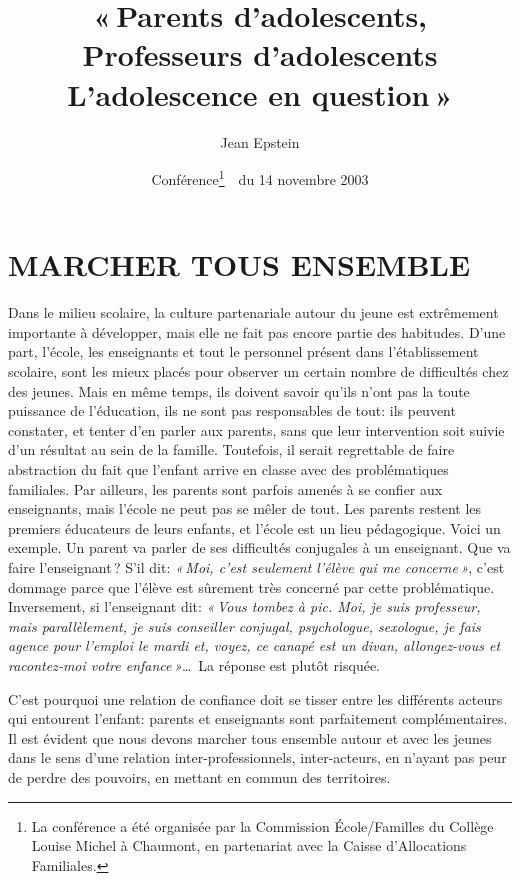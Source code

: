 \documentclass[11pt]{article} %
\title{« Parents d'adolescents, Professeurs d'adolescents\\L'adolescence en question »}
\author{Jean Epstein}
\date{Conférence\footnote{La conférence a été organisée par la Commission École/Familles du Collège Louise Michel à Chaumont, en partenariat avec la Caisse d’Allocations Familiales.}\ \ du 14 novembre 2003}
\begin{document}
\maketitle


\section{MARCHER TOUS ENSEMBLE}

  Dans le milieu scolaire, la culture partenariale autour du jeune est extrêmement importante à développer, mais elle ne fait pas encore partie des habitudes.\newline
  D'une part, l'école, les enseignants et tout le personnel présent dans l'établissement scolaire, sont les mieux placés pour observer un certain nombre de difficultés chez des jeunes. Mais en même temps, ils doivent savoir qu'ils n'ont pas la toute puissance de l'éducation, ils ne sont pas responsables de tout: ils peuvent constater, et tenter d'en parler aux parents, sans que leur intervention soit suivie d'un résultat au sein de la famille. Toutefois, il serait regrettable de faire abstraction du fait que l'enfant arrive en classe avec des problématiques familiales.\newline
  Par ailleurs, les parents sont parfois amenés à se confier aux enseignants, mais l'école ne peut pas se mêler de tout. Les parents restent les premiers éducateurs de leurs enfants, et l'école est un lieu pédagogique.\newline
  Voici un exemple. Un parent va parler de ses difficultés conjugales à un enseignant. Que va faire l'enseignant ? S'il dit: \textit{« Moi, c'est seulement l'élève qui me concerne »}, c'est dommage parce que l'élève est sûrement très concerné par cette problématique. Inversement, si l'enseignant dit: \textit{« Vous tombez à pic. Moi, je suis professeur, mais parallèlement, je suis conseiller conjugal, psychologue, sexologue, je fais agence pour l'emploi le mardi et, voyez, ce canapé est un divan, allongez-vous et racontez-moi votre enfance »}\dots\ La réponse est plutôt risquée.

  C'est pourquoi une relation de confiance doit se tisser entre les différents acteurs qui entourent l'enfant: parents et enseignants sont parfaitement complémentaires.\newline
  Il est évident que nous devons marcher tous ensemble autour et avec les jeunes dans le sens d'une relation inter-professionnels, inter-acteurs, en n'ayant pas peur de perdre des pouvoirs, en mettant en commun des territoires.
\end{document}
